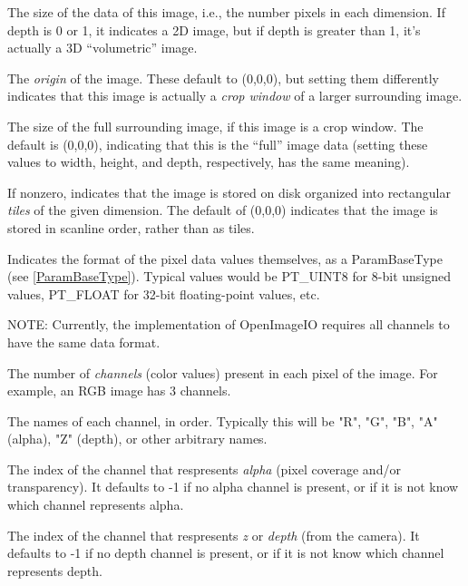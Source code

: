 The size of the data of this image, i.e., the number pixels in each
dimension.  If {\kw depth} is 0 or 1, it indicates a 2D image, but if
{\kw depth} is greater than 1, it's actually a 3D ``volumetric'' image.
\apiend

The \emph{origin} of the image.  These default to (0,0,0), but setting
them differently indicates that this image is actually a \emph{crop window}
of a larger surrounding image.
\apiend

The size of the full surrounding image, if this image is a crop window.
The default is (0,0,0), indicating that this is the ``full'' image data
(setting these values to {\kw width}, {\kw height}, and {\kw depth},
respectively, has the same meaning).
\apiend

If nonzero, indicates that the image is stored on disk organized into
rectangular \emph{tiles} of the given dimension.  The default of 
(0,0,0) indicates that the image is stored in scanline order, rather
than as tiles.
\apiend

Indicates the format of the pixel data values themselves, as a 
{\kw ParamBaseType} (see \ref{ParamBaseType}).  Typical values would be
{\kw PT_UINT8} for 8-bit unsigned values, {\kw PT_FLOAT} for 32-bit
floating-point values, etc.

\noindent NOTE: Currently, the implementation of OpenImageIO requires
all channels to have the same data format.
\apiend

The number of \emph{channels} (color values) present in each pixel of
the image.  For example, an RGB image has 3 channels.
\apiend

The names of each channel, in order.  Typically this will be "R", "G",
"B", "A" (alpha), "Z" (depth), or other arbitrary names.
\apiend

The index of the channel that respresents \emph{alpha} (pixel coverage
and/or transparency).  It defaults to -1 if no alpha channel is present,
or if it is not know which channel represents alpha.
\apiend

The index of the channel that respresents \emph{z} or \emph{depth} (from
the camera).  It defaults to -1 if no depth channel is present, or if it
is not know which channel represents depth.
\apiend

